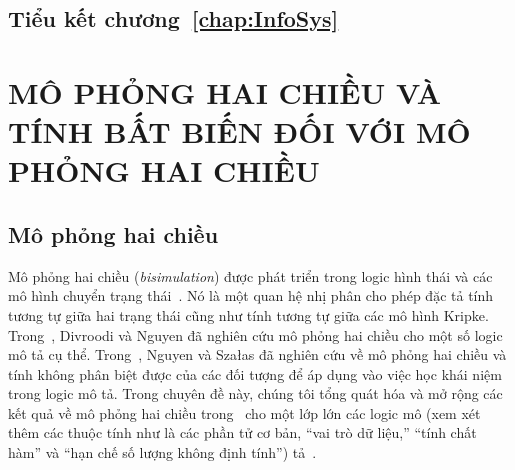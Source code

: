 \documentclass[12pt,a4paper,twoside]{report}
\theoremstyle{definition}
\begin{document}
\section*{Tiểu kết chương~\ref{chap:InfoSys}}

\chapter{MÔ PHỎNG HAI CHIỀU VÀ TÍNH BẤT BIẾN ĐỐI VỚI MÔ PHỎNG HAI CHIỀU}
\label{chap:Bisimulation}
\section{Mô phỏng hai chiều}
\label{sec:Bisimulation}
Mô phỏng hai chiều ({\em bisimulation}) được phát triển trong logic hình thái và các mô hình chuyển trạng thái~\cite{Benthem1983,Benthem2001,Benthem2010,Blackburn2001,Blackburn2006}. Nó là một quan hệ nhị phân cho phép đặc tả tính tương tự giữa hai trạng thái cũng như tính tương tự giữa các mô hình Kripke. Trong~\cite{Divroodi2011B}, Divroodi và Nguyen đã nghiên cứu mô phỏng hai chiều cho một số logic mô tả cụ thể. Trong~\cite{Nguyen2013}, Nguyen và Sza{\l}as đã nghiên cứu về mô phỏng hai chiều và tính không phân biệt được của các đối tượng để áp dụng vào việc học khái niệm trong logic mô tả. Trong chuyên đề này, chúng tôi tổng quát hóa và mở rộng các kết quả về mô phỏng hai chiều trong~\cite{Divroodi2011B,Nguyen2013} cho một lớp lớn các logic mô (xem xét thêm các thuộc tính như là các phần tử cơ bản, ``vai trò dữ liệu,'' ``tính chất hàm'' và ``hạn chế số lượng không định tính'') tả~\cite{Tran2012,Ha2012,Tran2013}.
\end{document}
